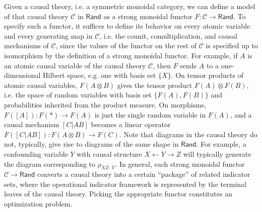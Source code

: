 \documentclass[sigconf]{acmart}
\newcommand{\Cat}[1]{\mathsf{#1}}
\def\Rand{\Cat{Rand}}
\begin{document}
{Given a causal theory, i.e. a symmetric monoidal category, we can define a model of that causal theory $\mathcal{C}$ in $\Rand$ as a strong monoidal functor $F : \mathcal{C} \to \Rand$. To specify such a functor, it suffices to define its behavior on every atomic variable and every generating map in $\mathcal{C}$, i.e. the counit, comultiplication, and causal mechanisms of $\mathcal{C}$, since the values of the functor on the rest of $\mathcal{C}$ is specified up to isomorphism by the definition of a strong monoidal functor. For example, if $A$ is an atomic causal variable of the causal theory $\mathcal{C}$, then $F$ sends $A$ to a one-dimensional Hilbert space, e.g. one with basis set $\{X\}$. On tensor products of atomic causal variables, $F(A \otimes B)$ gives the tensor product $F(A) \otimes F(B)$, i.e. the space of random variables with basis set $\{F(A), F(B)\}$ and probabilities inherited from the product measure. On morphisms, $F([A]) : F(\ast) \to F(A)$ is just the single random variable in $F(A)$, and a causal mechanism $[C|AB]$ becomes a linear operator $F([C|AB]) : F(A \otimes B) \to F(C)$. %
}
Note that diagrams in the causal theory do not, typically, give rise to diagrams of the same shape in $\Rand$. For example, a confounding variable $Y$ with causal structure $X \leftarrow Y \to Z$ will typically generate the diagram corresponding to $\rho_{XZ\cdot Y}$. In general, each strong monoidal functor $\mathcal{C} \to \Rand$ converts a causal theory into a certain ``package'' of related indicator sets, where the operational indicator framework is represented by the terminal leaves of the causal theory. Picking the appropriate functor constitutes an optimization problem.



\end{document}
